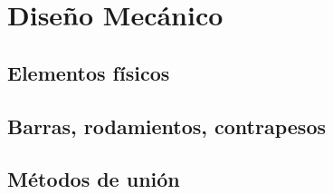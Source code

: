 

\chapter{\textcolor{Azul}{Diseño Mecánico}}

\section{Elementos físicos}

\section{Barras, rodamientos, contrapesos}

\section{Métodos de unión}
